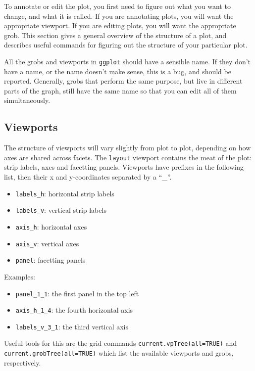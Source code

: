 To annotate or edit the plot, you first need to figure out what you want to change, and what it is called.  If you are annotating plots, you will want the appropriate viewport.  If you are editing plots, you will want the appropriate grob.  This section gives a general overview of the structure of a plot, and describes useful commands for figuring out the structure of your particular plot.

All the grobs and viewports in {\tt ggplot} should have a sensible name.  If they don't have a name, or the name doesn't make sense, this is a bug, and should be reported.  Generally, grobs that perform the same purpose, but live in different parts of the graph, still have the same name so that you can edit all of them simultaneously.  

\subsection{Viewports}\label{sub:viewports}

The structure of viewports will vary slightly from plot to plot, depending on how axes are shared across facets.  The {\tt layout} viewport contains the meat of the plot: strip labels, axes and facetting panels.  Viewports have prefixes in the following list, then their x and y-coordinates separated by a ``\_''.

\begin{itemize}
  \item {\tt labels\_h}: horizontal strip labels
  \item {\tt labels\_v}: vertical strip labels
  \item {\tt axis\_h}: horizontal axes
  \item {\tt axis\_v}: vertical axes
  \item {\tt panel}: facetting panels
\end{itemize}

Examples:

\begin{itemize}
  \item {\tt panel\_1\_1}: the first panel in the top left
  \item {\tt axis\_h\_1\_4}: the fourth horizontal axis
  \item {\tt labels\_v\_3\_1}: the third vertical axis
\end{itemize}

Useful tools for this are the grid commands {\tt current.vpTree(all=TRUE)} and {\tt current.grobTree(all=TRUE)} which list the available viewports and grobs, respectively.  

